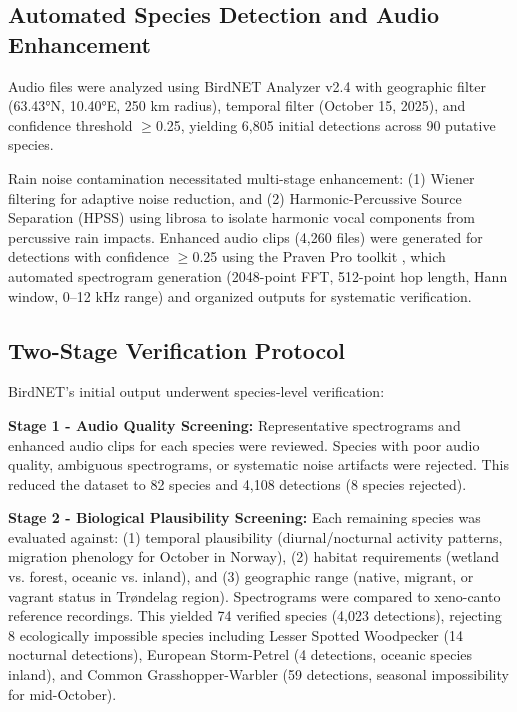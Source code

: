 \documentclass[english,twocolumn]{article}
\begin{document}
\subsection{Automated Species Detection and Audio Enhancement}

Audio files were analyzed using BirdNET Analyzer v2.4 \citep{Kahl2021} with geographic filter (63.43°N, 10.40°E, 250 km radius), temporal filter (October 15, 2025), and confidence threshold $\geq$0.25, yielding 6,805 initial detections across 90 putative species.

Rain noise contamination necessitated multi-stage enhancement: (1) Wiener filtering for adaptive noise reduction, and (2) Harmonic-Percussive Source Separation (HPSS) using librosa to isolate harmonic vocal components from percussive rain impacts. Enhanced audio clips (4,260 files) were generated for detections with confidence $\geq$0.25 using the Praven Pro toolkit \citep{Redpath2025}, which automated spectrogram generation (2048-point FFT, 512-point hop length, Hann window, 0--12 kHz range) and organized outputs for systematic verification.

\subsection{Two-Stage Verification Protocol}

BirdNET's initial output underwent species-level verification:

\textbf{Stage 1 - Audio Quality Screening:} Representative spectrograms and enhanced audio clips for each species were reviewed. Species with poor audio quality, ambiguous spectrograms, or systematic noise artifacts were rejected. This reduced the dataset to 82 species and 4,108 detections (8 species rejected).

\textbf{Stage 2 - Biological Plausibility Screening:} Each remaining species was evaluated against: (1) temporal plausibility (diurnal/nocturnal activity patterns, migration phenology for October in Norway), (2) habitat requirements (wetland vs. forest, oceanic vs. inland), and (3) geographic range (native, migrant, or vagrant status in Trøndelag region). Spectrograms were compared to xeno-canto reference recordings. This yielded 74 verified species (4,023 detections), rejecting 8 ecologically impossible species including Lesser Spotted Woodpecker (14 nocturnal detections), European Storm-Petrel (4 detections, oceanic species inland), and Common Grasshopper-Warbler (59 detections, seasonal impossibility for mid-October).
\end{document}
